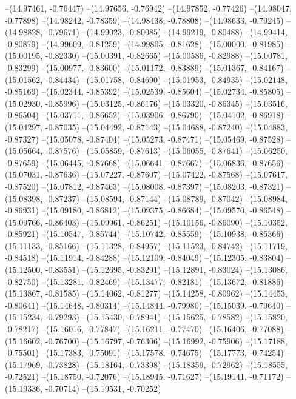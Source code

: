 --(14.97461, -0.76447)
--(14.97656, -0.76942)
--(14.97852, -0.77426)
--(14.98047, -0.77898)
--(14.98242, -0.78359)
--(14.98438, -0.78808)
--(14.98633, -0.79245)
--(14.98828, -0.79671)
--(14.99023, -0.80085)
--(14.99219, -0.80488)
--(14.99414, -0.80879)
--(14.99609, -0.81259)
--(14.99805, -0.81628)
--(15.00000, -0.81985)
--(15.00195, -0.82330)
--(15.00391, -0.82665)
--(15.00586, -0.82988)
--(15.00781, -0.83299)
--(15.00977, -0.83600)
--(15.01172, -0.83889)
--(15.01367, -0.84167)
--(15.01562, -0.84434)
--(15.01758, -0.84690)
--(15.01953, -0.84935)
--(15.02148, -0.85169)
--(15.02344, -0.85392)
--(15.02539, -0.85604)
--(15.02734, -0.85805)
--(15.02930, -0.85996)
--(15.03125, -0.86176)
--(15.03320, -0.86345)
--(15.03516, -0.86504)
--(15.03711, -0.86652)
--(15.03906, -0.86790)
--(15.04102, -0.86918)
--(15.04297, -0.87035)
--(15.04492, -0.87143)
--(15.04688, -0.87240)
--(15.04883, -0.87327)
--(15.05078, -0.87404)
--(15.05273, -0.87471)
--(15.05469, -0.87528)
--(15.05664, -0.87576)
--(15.05859, -0.87613)
--(15.06055, -0.87641)
--(15.06250, -0.87659)
--(15.06445, -0.87668)
--(15.06641, -0.87667)
--(15.06836, -0.87656)
--(15.07031, -0.87636)
--(15.07227, -0.87607)
--(15.07422, -0.87568)
--(15.07617, -0.87520)
--(15.07812, -0.87463)
--(15.08008, -0.87397)
--(15.08203, -0.87321)
--(15.08398, -0.87237)
--(15.08594, -0.87144)
--(15.08789, -0.87042)
--(15.08984, -0.86931)
--(15.09180, -0.86812)
--(15.09375, -0.86684)
--(15.09570, -0.86548)
--(15.09766, -0.86403)
--(15.09961, -0.86251)
--(15.10156, -0.86090)
--(15.10352, -0.85921)
--(15.10547, -0.85744)
--(15.10742, -0.85559)
--(15.10938, -0.85366)
--(15.11133, -0.85166)
--(15.11328, -0.84957)
--(15.11523, -0.84742)
--(15.11719, -0.84518)
--(15.11914, -0.84288)
--(15.12109, -0.84049)
--(15.12305, -0.83804)
--(15.12500, -0.83551)
--(15.12695, -0.83291)
--(15.12891, -0.83024)
--(15.13086, -0.82750)
--(15.13281, -0.82469)
--(15.13477, -0.82181)
--(15.13672, -0.81886)
--(15.13867, -0.81585)
--(15.14062, -0.81277)
--(15.14258, -0.80962)
--(15.14453, -0.80641)
--(15.14648, -0.80314)
--(15.14844, -0.79980)
--(15.15039, -0.79640)
--(15.15234, -0.79293)
--(15.15430, -0.78941)
--(15.15625, -0.78582)
--(15.15820, -0.78217)
--(15.16016, -0.77847)
--(15.16211, -0.77470)
--(15.16406, -0.77088)
--(15.16602, -0.76700)
--(15.16797, -0.76306)
--(15.16992, -0.75906)
--(15.17188, -0.75501)
--(15.17383, -0.75091)
--(15.17578, -0.74675)
--(15.17773, -0.74254)
--(15.17969, -0.73828)
--(15.18164, -0.73398)
--(15.18359, -0.72962)
--(15.18555, -0.72521)
--(15.18750, -0.72076)
--(15.18945, -0.71627)
--(15.19141, -0.71172)
--(15.19336, -0.70714)
--(15.19531, -0.70252)
